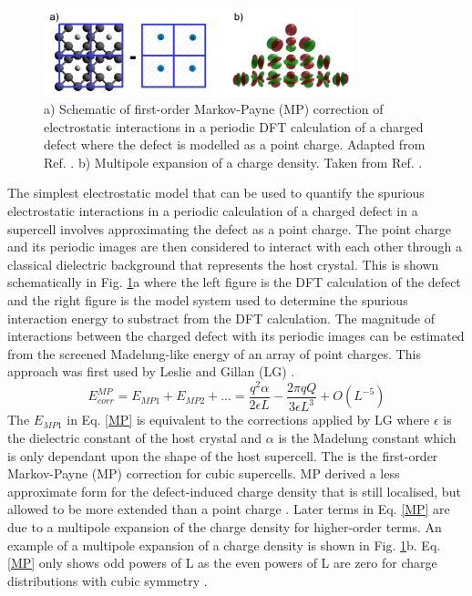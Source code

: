 \documentclass[11pt, twoside]{report}
\begin{document}
\begin{figure}[h!]
  \centering
    \includegraphics[width=0.8\textwidth]{figures/IIC.png}
    \caption[a) Schematic of first-order Markov-Payne (MP) correction of electrostatic interactions in a periodic DFT calculation of a charged defect where the defect is modelled as a point charge.  b) Multipole expansion of a charge density.]{a) Schematic of first-order Markov-Payne (MP) correction of electrostatic interactions in a periodic DFT calculation of a charged defect where the defect is modelled as a point charge. Adapted from Ref. . b) Multipole expansion of a charge density. Taken from Ref. .}
  \label{IIC}
\end{figure}

The simplest electrostatic model that can be used to quantify the spurious electrostatic interactions in a periodic calculation of a charged defect in a supercell involves approximating the defect as a point charge. The point charge and its periodic images are then considered to interact with each other through a classical dielectric background that represents the host crystal. This is shown schematically in Fig. \ref{IIC}a where the left figure is the DFT calculation of the defect and the right figure is the model system used to determine the spurious interaction energy to substract from the DFT calculation. The magnitude of interactions between the charged defect with its periodic images can be estimated from the screened Madelung-like energy of an array of point charges. This approach was first used by Leslie and Gillan (LG) \cite{LeslieGillan}. 
\begin{equation}\label{MP}
E^{MP}_{corr} = E_{MP1} + E_{MP2} + ... = \frac{q^2\alpha}{2 \epsilon L} - \frac{2 \pi q Q}{3 \epsilon L^3} + O(L^{-5})
\end{equation}
The $E_{MP1}$ in Eq. \ref{MP} is equivalent to the corrections applied by LG where $\epsilon$ is the dielectric constant of the host crystal and $\alpha$ is the Madelung constant which is only dependant upon the shape of the host supercell. The is the first-order Markov-Payne (MP) correction for cubic supercells.
MP derived a less approximate form for the defect-induced charge density that is still localised, but allowed to be more extended than a point charge \cite{MP}. Later terms in Eq. \ref{MP} are due to a multipole expansion of the charge density for higher-order terms. An example of a multipole expansion of a charge density is shown in Fig. \ref{IIC}b. Eq. \ref{MP} only shows odd powers of L as the even powers of L are zero for charge distributions with cubic symmetry \cite{Durrant_defects}.
\end{document}
